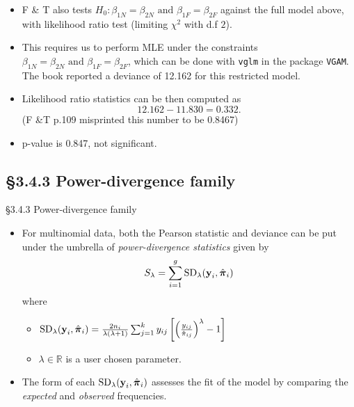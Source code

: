 \documentclass{beamer}
\newcommand{\currentsubsection}{}
\let\oldsubsection\subsection
\renewcommand{\subsection}[1]{\oldsubsection{#1}\renewcommand{\currentsubsection}{#1}}
\newenvironment{wideitemize}%
  {\begin{itemize}%
    \setlength{\parskip}{1em}}%
  {\end{itemize}}
\begin{document}
\begin{frame}
 
 \begin{wideitemize}
 
\item F \& T also tests $H_0 : \beta_{1N} = \beta_{2N} \text{ and } \beta_{1F} = \beta_{2F} $ against the full model above, with likelihood ratio test (limiting $\chi^2$ with d.f $2$). 
 
 \item This requires us to perform MLE under the constraints $ \beta_{1N} = \beta_{2N} \text{ and } \beta_{1F} = \beta_{2F} $, which 
 can be done with \texttt{vglm} in the package \texttt{VGAM}. The book reported a deviance of 12.162 for this restricted model.
 
 
 \item Likelihood ratio statistics can be then computed as 
 \[
 12.162 - 11.830 = 0.332.
 \]
 (F \&T p.109 misprinted this number to be 0.8467)

 \item p-value is 0.847, not significant.
 \end{wideitemize}

\end{frame}


\subsection{\S3.4.3 Power-divergence family}\label{sec:3.4.3}
%
%


\begin{frame}{\S3.4.3 Power-divergence family}



\begin{wideitemize}
\item
For multinomial data, both the Pearson statistic and deviance can be put under the umbrella of \emph{power-divergence statistics}  \cite{CressieRead1988}  given by
\[
S_\lambda =\sum_{i=1}^g \mbox{SD}_\lambda (\textbf{y}_i, \hat{\mbox{\boldmath $\pi$}}_i)
\]
where  
\begin{itemize}
\item
$
\mbox{SD}_\lambda (\textbf{y}_i, \hat{\mbox{\boldmath $\pi$}}_i)=\frac{2n_i}{\lambda (\lambda+1)}
\sum_{j=1}^k y_{ij}\left[\left(\frac{y_{ij}}{\hat{\pi}_{ij}}\right)^\lambda -1 \right]
$
\item 
$\lambda\in \mathbb{R}$ is a user chosen parameter.
\end{itemize}
\item The form of each $\mbox{SD}_\lambda (\textbf{y}_i, \hat{\mbox{\boldmath $\pi$}}_i)$ assesses the fit of the model by comparing the \emph{expected} and \emph{observed} frequencies.
\end{wideitemize}
\end{frame}
\end{document}
